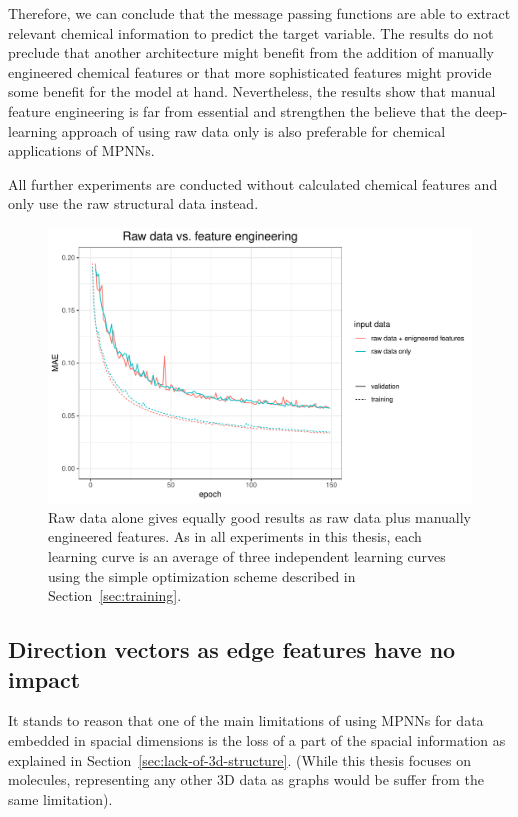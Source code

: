 Therefore, we can conclude that the message passing functions are able to extract relevant chemical information to predict the target variable. The results do not preclude that another architecture might benefit from the addition of manually engineered chemical features or that more sophisticated features might provide some benefit for the model at hand. Nevertheless, the results show that manual feature engineering is far from essential and strengthen the believe that the deep-learning approach of using raw data only is also preferable for chemical applications of MPNNs.

All further experiments are conducted without calculated chemical features and only use the raw structural data instead.

\begin{figure}[H]
	\includegraphics[width=\linewidth]{figures/raw-data}
	\caption{Raw data alone gives equally good results as raw data plus manually engineered features. As in all experiments in this thesis, each learning curve is an average of three independent learning curves using the simple optimization scheme described in Section~\ref{sec:training}.}
	\label{fig:raw-data}
\end{figure}




\subsection{Direction vectors as edge features have no impact}
\label{sec:direction-vectors}

It stands to reason that one of the main limitations of using MPNNs for data embedded in spacial dimensions is the loss of a part of the spacial information as explained in Section~\ref{sec:lack-of-3d-structure}. (While this thesis focuses on molecules, representing any other 3D data as graphs would be suffer from the same limitation).
	
